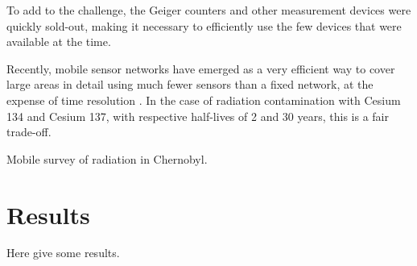 \documentclass[11pt]{article}
\begin{document}
To add to the challenge, the Geiger counters and other measurement devices were
quickly sold-out, making it necessary to efficiently use the few devices that
were available at the time.

Recently, mobile sensor networks have emerged as a very efficient way to cover
large areas in detail using much fewer sensors than a fixed network, at the
expense of time resolution \cite{aberer2010opensense}. In the case of radiation
contamination with Cesium 134 and Cesium 137, with respective half-lives of 2
and 30 years, this is a fair trade-off.

Mobile survey of radiation in Chernobyl\cite{arvela1990mobile}.

\section*{Results}
\label{sec:results}

Here give some results.

\begin{figure}[ht]
\centering
{}
\end{figure}
\end{document}
